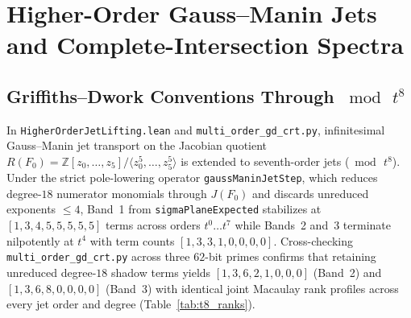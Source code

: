 \documentclass[11pt,a4paper]{article}
\begin{document}
\section{Higher-Order Gauss--Manin Jets and Complete-Intersection Spectra}

\subsection{Griffiths--Dwork Conventions Through $\bmod\, t^8$}

In \texttt{HigherOrderJetLifting.lean} and \texttt{multi\_order\_gd\_crt.py}, infinitesimal Gauss--Manin jet transport on the Jacobian quotient $R(F_0) = \mathbb{Z}[z_0,\dots,z_5]/\langle z_0^5,\dots,z_5^5\rangle$ is extended to seventh-order jets ($\bmod\, t^8$). Under the strict pole-lowering operator \texttt{gaussManinJetStep}, which reduces degree-$18$ numerator monomials through $J(F_0)$ and discards unreduced exponents $\le 4$, Band~1 from \texttt{sigmaPlaneExpected} stabilizes at $[1, 3, 4, 5, 5, 5, 5, 5]$ terms across orders $t^0\dots t^7$ while Bands~2 and~3 terminate nilpotently at $t^4$ with term counts $[1, 3, 3, 1, 0, 0, 0, 0]$. Cross-checking \texttt{multi\_order\_gd\_crt.py} across three $62$-bit primes confirms that retaining unreduced degree-$18$ shadow terms yields $[1, 3, 6, 2, 1, 0, 0, 0]$ (Band~2) and $[1, 3, 6, 8, 0, 0, 0, 0]$ (Band~3) with identical joint Macaulay rank profiles across every jet order and degree (Table~\ref{tab:t8_ranks}).

\begin{table}[htbp]
  \centering
  \caption{Joint Macaulay contraction ranks through $\bmod\, t^8$ alongside unmixed codimension-$3$ complete-intersection quotient profiles in $R(F_0)$.}
  \label{tab:t8_ranks}
\end{table}
\end{document}
